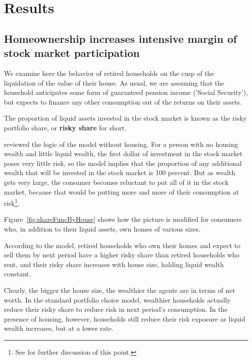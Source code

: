 
  \section{Results}

  \subsection{Homeownership increases intensive margin of stock market participation}

  We examine here the behavior of retired households on the cusp of the liquidation of the value of their house.  As usual, we are assuming that the household anticipates some form of guaranteed pension income ('Social Security'), but expects to finance any other consumption out of the returns on their assets.

  The proportion of liquid assets invested in the stock market is known as the risky portfolio share, or \textbf{risky share} for short.

  \cite{Carroll2020} reviewed the logic of the model without housing. For a person with no housing wealth and little liquid wealth, the first dollar of investment in the stock market poses very little risk, so the model implies that the proportion of any additional wealth that will be invested in the stock market is 100 percent.  But as wealth gets very large, the consumer becomes reluctant to put all of it in the stock market, because that would be putting more and more of their consumption at risk\footnote{See \cite{Carroll2020} for further discussion of this point.}.

  \renewcommand{\figName}{shareFuncByHouse}
  \renewcommand{\figFile}{\figName} %


Figure~\ref{fig:shareFuncByHouse} shows how the picture is modified for consumers who, in addition to their liquid assets, own homes of various sizes.

According to the model, retired households who own their homes and expect to sell them by next period have a higher risky share than retired households who rent, and their risky share increases with house size, holding liquid wealth constant.

Clearly, the bigger the house size, the wealthier the agents are in terms of net worth. In the standard portfolio choice model, wealthier households actually reduce their risky share to reduce risk in next period's consumption. In the presence of housing, however, households still reduce their risk exposure as liquid wealth increases, but at a lower rate.

